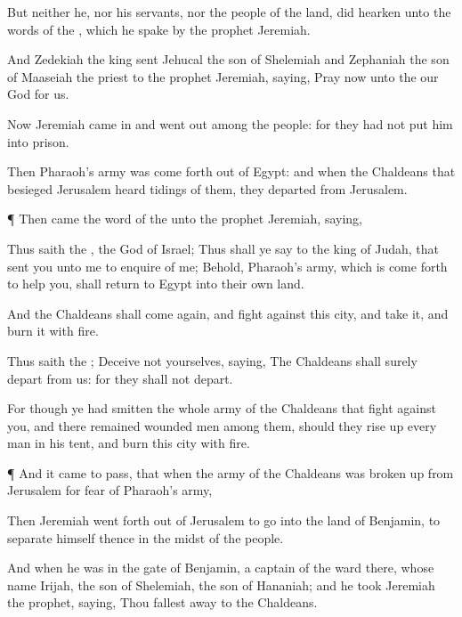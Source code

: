 {But neither he, nor his
servants, nor the
people of the
land, did
hearken unto the
words of the
{}, which he
spake
by the
prophet
Jeremiah.

And
Zedekiah the
king
sent
Jehucal the
son of
Shelemiah and
Zephaniah the
son of
Maaseiah the
priest to the
prophet
Jeremiah,
saying,
Pray now unto the
{} our
God for us.

Now
Jeremiah came
in and went
out
among the
people: for they had not
put him into
prison.

Then
Pharaoh’s
army was come
forth out of
Egypt: and when the
Chaldeans that
besieged
Jerusalem
heard
tidings of them, they
departed from
Jerusalem.


\par }{\PP {}¶ Then came the
word of the
{} unto the
prophet
Jeremiah,
saying,

Thus
saith the
{}, the
God of
Israel; Thus shall ye
say to the
king of
Judah, that
sent you unto me to
enquire of me; Behold,
Pharaoh’s
army, which is come
forth to
help you, shall
return to
Egypt into their own
land.

And the
Chaldeans shall come
again, and
fight against this
city, and
take it, and
burn it with
fire.

Thus
saith the
{};
Deceive not
yourselves,
saying, The
Chaldeans shall
surely
depart from us: for they shall not
depart.

For though ye had
smitten the whole
army of the
Chaldeans that
fight against you, and there
remained
{}
wounded
men among them,
{} should they rise
up every
man in his
tent, and
burn this
city with
fire.


\par }{\PP {}¶ And it came to pass, that when the
army of the
Chaldeans was broken
up from
Jerusalem for
fear of
Pharaoh’s
army,

Then
Jeremiah went
forth out of
Jerusalem to
go into the
land of
Benjamin, to
separate himself thence in the
midst of the
people.

And when he was in the
gate of
Benjamin, a
captain of the
ward
{} there, whose
name
{}
Irijah, the
son of
Shelemiah, the
son of
Hananiah; and he
took
Jeremiah the
prophet,
saying, Thou fallest
away to the
Chaldeans.

}

